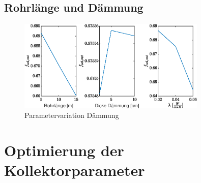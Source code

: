 \subsection{Rohrlänge und Dämmung}


\begin{figure}[H]
	\centering
	\includegraphics[width=0.8\textwidth]{../DATA/Aufgabe2.3.eps}
	\caption[Parametervariation Dämmung]{Parametervariation Dämmung}
	\label{fig:par2}
\end{figure}

\section{Optimierung der Kollektorparameter}

